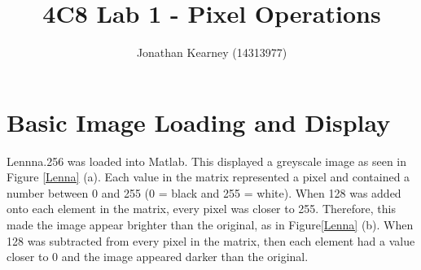\documentclass[11pt]{article}
\title{4C8 Lab 1 - Pixel Operations}
\author{Jonathan Kearney (14313977)}
\begin{document}
\maketitle






\newpage


\section{Basic Image Loading and Display}
Lennna.256 was loaded into Matlab. This displayed a greyscale image as seen in Figure \ref{Lenna} (a). Each value in the matrix represented a pixel and contained a number between 0 and 255 (0 = black and 255 = white). When 128 was added onto each element in the matrix, every pixel was closer to 255. Therefore, this made the image appear brighter than the original, as in Figure\ref{Lenna} (b). When 128 was subtracted from every pixel in the matrix, then each element had a value closer to 0 and the image appeared darker than the original.
\end{document}

